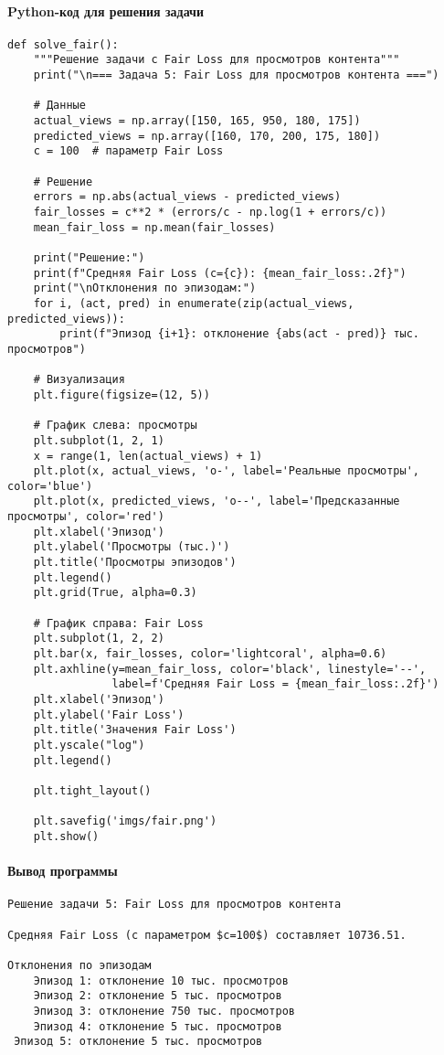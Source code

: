 \paragraph*{Python-код для решения задачи}
\begin{verbatim}
def solve_fair():
    """Решение задачи с Fair Loss для просмотров контента"""
    print("\n=== Задача 5: Fair Loss для просмотров контента ===")
    
    # Данные
    actual_views = np.array([150, 165, 950, 180, 175])
    predicted_views = np.array([160, 170, 200, 175, 180])
    c = 100  # параметр Fair Loss
    
    # Решение
    errors = np.abs(actual_views - predicted_views)
    fair_losses = c**2 * (errors/c - np.log(1 + errors/c))
    mean_fair_loss = np.mean(fair_losses)
    
    print("Решение:")
    print(f"Средняя Fair Loss (c={c}): {mean_fair_loss:.2f}")
    print("\nОтклонения по эпизодам:")
    for i, (act, pred) in enumerate(zip(actual_views, predicted_views)):
        print(f"Эпизод {i+1}: отклонение {abs(act - pred)} тыс. просмотров")
    
    # Визуализация
    plt.figure(figsize=(12, 5))
    
    # График слева: просмотры
    plt.subplot(1, 2, 1)
    x = range(1, len(actual_views) + 1)
    plt.plot(x, actual_views, 'o-', label='Реальные просмотры', color='blue')
    plt.plot(x, predicted_views, 'o--', label='Предсказанные просмотры', color='red')
    plt.xlabel('Эпизод')
    plt.ylabel('Просмотры (тыс.)')
    plt.title('Просмотры эпизодов')
    plt.legend()
    plt.grid(True, alpha=0.3)
    
    # График справа: Fair Loss
    plt.subplot(1, 2, 2)
    plt.bar(x, fair_losses, color='lightcoral', alpha=0.6)
    plt.axhline(y=mean_fair_loss, color='black', linestyle='--', 
                label=f'Средняя Fair Loss = {mean_fair_loss:.2f}')
    plt.xlabel('Эпизод')
    plt.ylabel('Fair Loss')
    plt.title('Значения Fair Loss')
    plt.yscale("log")
    plt.legend()
    
    plt.tight_layout()
    
    plt.savefig('imgs/fair.png')
    plt.show()
\end{verbatim}
\paragraph{Вывод программы}
\begin{verbatim}
Решение задачи 5: Fair Loss для просмотров контента

Средняя Fair Loss (с параметром $c=100$) составляет 10736.51.

Отклонения по эпизодам
    Эпизод 1: отклонение 10 тыс. просмотров
    Эпизод 2: отклонение 5 тыс. просмотров
    Эпизод 3: отклонение 750 тыс. просмотров
    Эпизод 4: отклонение 5 тыс. просмотров
 Эпизод 5: отклонение 5 тыс. просмотров
\end{verbatim}

